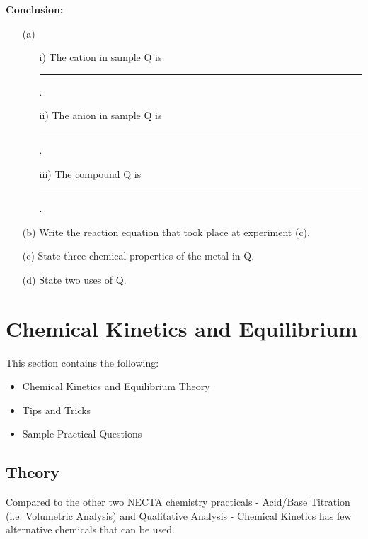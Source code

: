 \vspace*{-7mm}
\noindent \textbf{Conclusion:} 
\begin{enumerate}[topsep=0ex,itemsep=0ex,partopsep=1ex,parsep=1ex]
	\item[(a)] 
	\begin{enumerate}[topsep=0ex,itemsep=0ex,partopsep=1ex,parsep=1ex]
		\item[i)] The cation in sample Q is \rule{1.5cm}{0.15mm}.
		\item[ii)] The anion in sample Q is \rule{1.5cm}{0.15mm}.
		\item[iii)] The compound Q is \rule{1.5cm}{0.15mm}.
	\end{enumerate}
	\item[(b)] Write the reaction equation that took place at experiment (c).
	\item[(c)] State three chemical properties of the metal in Q.
	\item[(d)] State two uses of Q. 
\end{enumerate}


\section{Chemical Kinetics and Equilibrium}   

This section contains the following:
\begin{itemize}[topsep=0ex,itemsep=0ex,partopsep=1ex,parsep=1ex]
	\item Chemical Kinetics and Equilibrium Theory
	\item Tips and Tricks
	\item Sample Practical Questions
\end{itemize}
\subsection{Theory}
Compared to the other two NECTA chemistry practicals - Acid/Base Titration (i.e. Volumetric Analysis) and Qualitative Analysis - Chemical Kinetics has few alternative chemicals that can be used.\\

